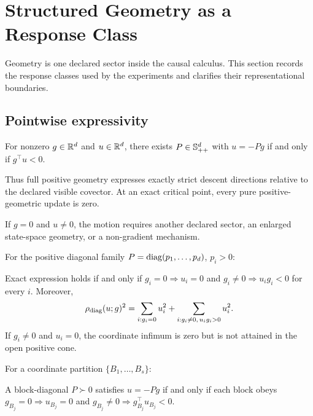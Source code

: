 \section{Structured Geometry as a Response Class}
\label{sec:geometric-response}

Geometry is one declared sector inside the causal calculus.  This section records the response classes used by the experiments and clarifies their representational boundaries.

\subsection{Pointwise expressivity}

\begin{proposition}
\label{prop:full-spd-geometricization}
For nonzero $g\in\mathbb R^d$ and $u\in\mathbb R^d$, there exists $P\in\mathbb S_{++}^d$ with $u=-Pg$ if and only if $g^\top u<0$.
\end{proposition}

Thus full positive geometry expresses exactly strict descent directions relative to the declared visible covector.  At an exact critical point, every pure positive-geometric update is zero.

\begin{corollary}
\label{cor:critical-boundary}
If $g=0$ and $u\ne0$, the motion requires another declared sector, an enlarged state-space geometry, or a non-gradient mechanism.
\end{corollary}

For the positive diagonal family $P=\operatorname{diag}(p_1,\ldots,p_d)$, $p_i>0$:

\begin{proposition}
\label{prop:diagonal-expressivity}
Exact expression holds if and only if $g_i=0\Rightarrow u_i=0$ and $g_i\ne0\Rightarrow u_ig_i<0$ for every $i$.  Moreover,
\[
\rho_{\rm diag}(u;g)^2
=\sum_{i:g_i=0}u_i^2+
\sum_{i:g_i\ne0,\,u_ig_i>0}u_i^2.
\]
If $g_i\ne0$ and $u_i=0$, the coordinate infimum is zero but is not attained in the open positive cone.
\end{proposition}

For a coordinate partition $\{B_1,\ldots,B_s\}$:

\begin{proposition}
\label{prop:block-expressivity}
A block-diagonal $P\succ0$ satisfies $u=-Pg$ if and only if each block obeys $g_{B_j}=0\Rightarrow u_{B_j}=0$ and $g_{B_j}\ne0\Rightarrow g_{B_j}^\top u_{B_j}<0$.
\end{proposition}

